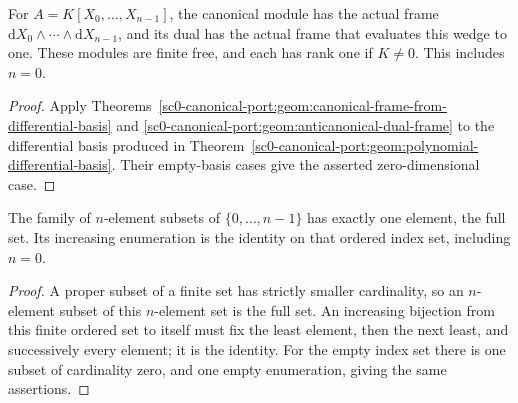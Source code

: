 \begin{corollary}
\label{sc0-canonical-port:geom:polynomial-canonical-frame}
\leanok
For \(A=K[X_0,\ldots,X_{n-1}]\), the canonical module has the
actual frame \(\mathrm dX_0\wedge\cdots\wedge\mathrm dX_{n-1}\),
and its dual has the actual frame that evaluates this wedge to one.
These modules are finite free, and each has rank one if \(K\ne0\).
This includes \(n=0\).
\end{corollary}
\begin{proof}
Apply Theorems~\ref{sc0-canonical-port:geom:canonical-frame-from-differential-basis}
and \ref{sc0-canonical-port:geom:anticanonical-dual-frame} to the differential basis
produced in Theorem~\ref{sc0-canonical-port:geom:polynomial-differential-basis}.
Their empty-basis cases give the asserted zero-dimensional case.
\end{proof}

\begin{lemma}
\label{sc0-canonical-port:geom:top-exterior-full-index}
\leanok
The family of \(n\)-element subsets of \(\{0,\ldots,n-1\}\)
has exactly one element, the full set. Its increasing enumeration
is the identity on that ordered index set, including \(n=0\).
\end{lemma}
\begin{proof}
A proper subset of a finite set has strictly smaller cardinality,
so an \(n\)-element subset of this \(n\)-element set is the
full set. An increasing bijection from this finite ordered set
to itself must fix the least element, then the next least, and
successively every element; it is the identity. For the empty
index set there is one subset of cardinality zero, and one empty
enumeration, giving the same assertions.
\end{proof}

